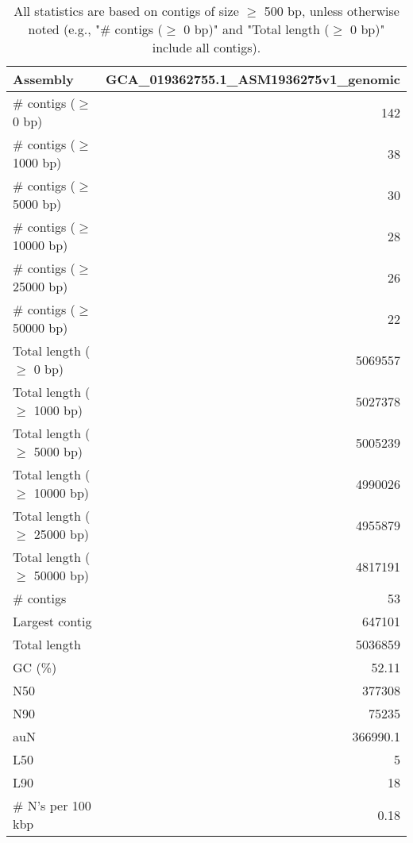 \documentclass[12pt,a4paper]{article}
\begin{document}
\begin{table}[ht]
\begin{center}
\caption{All statistics are based on contigs of size $\geq$ 500 bp, unless otherwise noted (e.g., "\# contigs ($\geq$ 0 bp)" and "Total length ($\geq$ 0 bp)" include all contigs).}
\begin{tabular}{|l*{1}{|r}|}
\hline
Assembly & GCA\_019362755.1\_ASM1936275v1\_genomic \\ \hline
\# contigs ($\geq$ 0 bp) & 142 \\ \hline
\# contigs ($\geq$ 1000 bp) & 38 \\ \hline
\# contigs ($\geq$ 5000 bp) & 30 \\ \hline
\# contigs ($\geq$ 10000 bp) & 28 \\ \hline
\# contigs ($\geq$ 25000 bp) & 26 \\ \hline
\# contigs ($\geq$ 50000 bp) & 22 \\ \hline
Total length ($\geq$ 0 bp) & 5069557 \\ \hline
Total length ($\geq$ 1000 bp) & 5027378 \\ \hline
Total length ($\geq$ 5000 bp) & 5005239 \\ \hline
Total length ($\geq$ 10000 bp) & 4990026 \\ \hline
Total length ($\geq$ 25000 bp) & 4955879 \\ \hline
Total length ($\geq$ 50000 bp) & 4817191 \\ \hline
\# contigs & 53 \\ \hline
Largest contig & 647101 \\ \hline
Total length & 5036859 \\ \hline
GC (\%) & 52.11 \\ \hline
N50 & 377308 \\ \hline
N90 & 75235 \\ \hline
auN & 366990.1 \\ \hline
L50 & 5 \\ \hline
L90 & 18 \\ \hline
\# N's per 100 kbp & 0.18 \\ \hline
\end{tabular}
\end{center}
\end{table}
\end{document}

